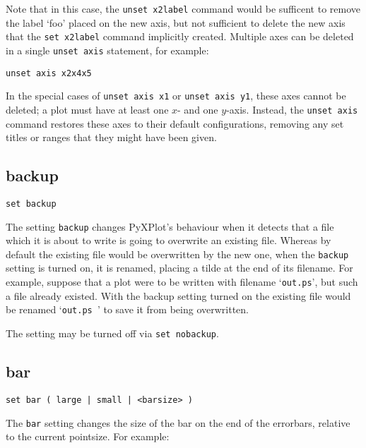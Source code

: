 \documentclass[a4paper,onecolumn,11pt]{book}
\begin{document}
Note that in this case, the {\tt unset x2label} command would be sufficent to
remove the label `foo' placed on the new axis, but not sufficient to delete the
new axis that the {\tt set x2label} command implicitly created. Multiple axes
can be deleted in a single {\tt unset axis} statement, for example:

\begin{verbatim}
unset axis x2x4x5
\end{verbatim}

In the special cases of {\tt unset axis x1} or {\tt unset axis y1}, these axes
cannot be deleted; a plot must have at least one $x$- and one $y$-axis. Instead,
the {\tt unset axis} command restores these axes to their default
configurations, removing any set titles or ranges that they might have been
given.

\subsection{backup}

\begin{verbatim}
set backup
\end{verbatim}

The setting {\tt backup} changes PyXPlot's behaviour when it detects that a file
which it is about to write is going to overwrite an existing file. Whereas by
default the existing file would be overwritten by the new one, when the
{\tt backup} setting is turned on, it is renamed, placing a tilde at the end of
its filename. For example, suppose that a plot were to be written with filename
`{\tt out.ps}', but such a file already existed.  With the backup setting turned on
the existing file would be renamed `{\tt out.ps~}' to save it from being overwritten.

The setting may be turned off via {\tt set nobackup}.


\subsection{bar}

\begin{verbatim}
set bar ( large | small | <barsize> )
\end{verbatim}

The {\tt bar} setting changes the size of the bar on the end of the errorbars,
relative to the current pointsize.  For example:
\end{document}
